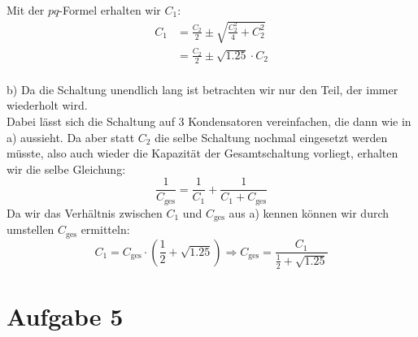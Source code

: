 \documentclass[11pt a4paper]{article}
\begin{document}
Mit der $pq$-Formel erhalten wir $C_1$:
\begin{align*}
	C_1 &= \frac{C_2}{2} \pm \sqrt{\frac{C_2^2}{4} + C_2^2} \\
	&= \frac{C_2}{2} \pm \sqrt{1.25} \cdot C_2 \\
\end{align*}

b) Da die Schaltung unendlich lang ist betrachten wir nur den Teil, der
immer wiederholt wird.\\
Dabei lässt sich die Schaltung auf 3 Kondensatoren vereinfachen, die dann
wie in a) aussieht. Da aber statt $C_2$ die selbe Schaltung nochmal 
eingesetzt werden müsste, also auch wieder die Kapazität der Gesamtschaltung
vorliegt, erhalten wir die selbe Gleichung:
\[
	\frac1{C_\text{ges}} = \frac{1}{C_1} + \frac{1}{C_1 + C_\text{ges}}
\]
Da wir das Verhältnis zwischen $C_1$ und $C_\text{ges}$ aus a) kennen 
können wir durch umstellen $C_\text{ges}$ ermitteln:
\[
	C_1 = C_\text{ges} \cdot \left( \frac12 + \sqrt{1.25} \right)
	\Rightarrow
	C_\text{ges} = \frac{C_1}{\frac12 + \sqrt{1.25}}
	\]


\section*{Aufgabe 5}
\end{document}
